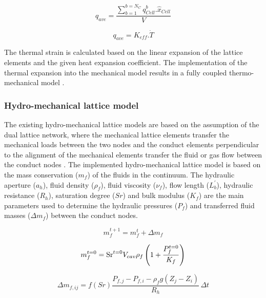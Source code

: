 \begin{equation}
\label{eq:LEM_Thermal_5}
q_{ave}=\frac{\sum_{b=1}^{b=N_C}q_{Cell}^b.\hat{x}_{Cell}}{V}
\end{equation}

\begin{equation}
\label{eq:LEM_Thermal_6}
q_{ave}=K_{eff}.\dot{T}
\end{equation}

The thermal strain is calculated based on the linear expansion of the lattice elements and the given heat expansion coefficient. The implementation of the thermal expansion into the mechanical model results in a fully coupled thermo-mechanical model \cite{Sattarietal2019b}.

\subsubsection*{Hydro-mechanical lattice model} \label{Section:HMLattice}

The existing hydro-mechanical lattice models are based on the assumption of the dual lattice network, where the mechanical lattice elements transfer the mechanical loads between the two nodes and the conduct elements perpendicular to the alignment of the mechanical elements transfer the fluid or gas flow between the conduct nodes \cite{Grassl2009, Grassletal2013}. The implemented hydro-mechanical lattice model is based on the mass conservation ($m_f$) of the fluids in the continuum. The hydraulic aperture ($a_h$), fluid density ($\rho_f$),  fluid viscosity ($\nu_f$), flow length ($L_b^\prime$), hydraulic resistance ($R_h$), saturation degree ($Sr$) and bulk modulus ($K_f$) are the main parameters used to determine the hydraulic pressures ($P_f$) and transferred fluid masses ($\Delta m_f$) between the conduct nodes. 

\begin{equation}
\label{eq:LEM_Hydro_1}
m_f^{t+1}=m_f^t+\Delta m_f
\end{equation}

\begin{equation}
\label{eq:LEM_Hydro_2}
m_f^{t=0}={\rm Sr}^{t=0}V_{cav}\rho_f\left(1+\frac{P_f^{t=0}}{K_f}\right)
\end{equation}

\begin{equation}
\label{eq:LEM_Hydro_3}
\Delta m_{f,ij}
=
f(Sr) \frac{P_{f,j}-P_{f,i}-\rho_fg\left(Z_j-Z_i\right)}{R_h} \, \Delta t
\end{equation}

